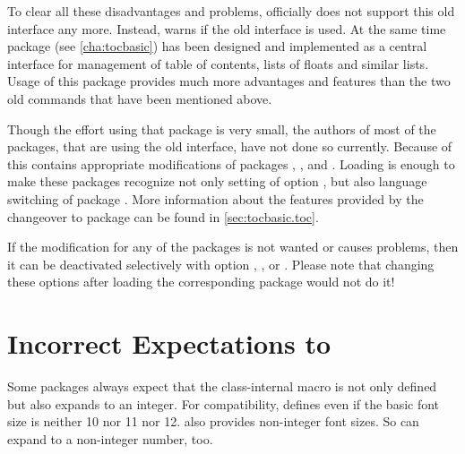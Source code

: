 To clear all these disadvantages and problems, \KOMAScript{} officially does not
support this old interface any more. Instead, \KOMAScript{} warns if the old
interface is used. At the same time package
 (see
\autoref{cha:tocbasic}) has been designed and implemented as a central
interface for management of table of contents, lists of floats and similar
lists. Usage of this package provides much more advantages and features than
the two old commands that have been mentioned above.

Though the effort using that package is very small, the authors of most of the
packages, that are using the old interface, have not done so currently. Because
of this  contains appropriate modifications of packages
,
, and
. Loading  is enough
to make these packages recognize not only setting of \KOMAScript{} option
, but also language
switching of package . More information
about the features provided by the changeover to package 
can be found in \autoref{sec:tocbasic.toc}.

If the modification for any of the packages is not wanted or causes problems,
then it can be deactivated selectively with option
,
,
or
.
Please note that changing these options after loading the
corresponding package would not do it!


\section{Incorrect Expectations to }

Some packages always expect that the class-internal macro
 is not only defined but also expands to an
integer. For compatibility, \KOMAScript{} defines  even if the
basic font size is neither 10 nor 11 nor
12. \KOMAScript{} also provides non-integer font sizes. So
 can expand to a non-integer number, too.

